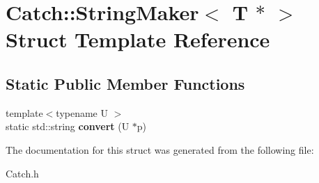 \hypertarget{struct_catch_1_1_string_maker_3_01_t_01_5_01_4}{\section{Catch\-:\-:String\-Maker$<$ T $\ast$ $>$ Struct Template Reference}
\label{struct_catch_1_1_string_maker_3_01_t_01_5_01_4}
}
\subsection*{Static Public Member Functions}
\begin{DoxyCompactItemize}
\item 
\hypertarget{struct_catch_1_1_string_maker_3_01_t_01_5_01_4_a2adbc75c99d71b8323f4052bcb0815c9}{{\footnotesize template$<$typename U $>$ }\\static std\-::string {\bfseries convert} (U $\ast$p)}\label{struct_catch_1_1_string_maker_3_01_t_01_5_01_4_a2adbc75c99d71b8323f4052bcb0815c9}

\end{DoxyCompactItemize}


The documentation for this struct was generated from the following file\-:\begin{DoxyCompactItemize}
\item 
Catch.\-h\end{DoxyCompactItemize}
